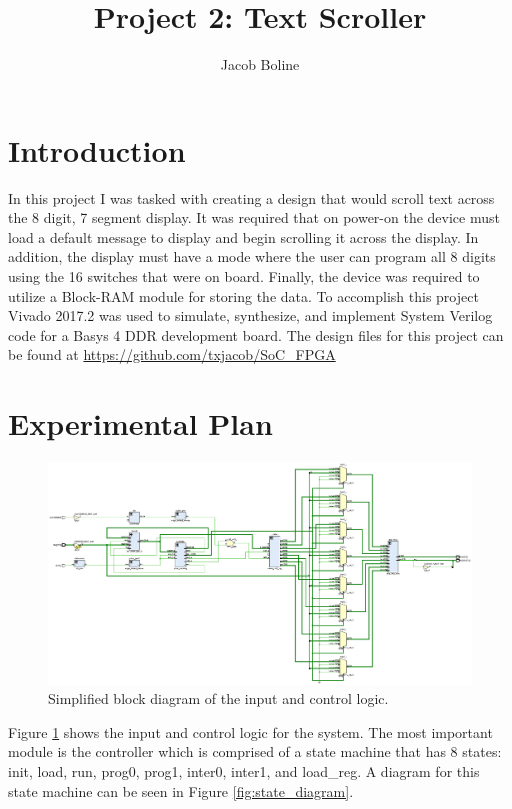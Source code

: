 \documentclass[11pt]{article}
\title{Project 2: Text Scroller}
\author{Jacob Boline}
\begin{document}
\maketitle

\section{Introduction}
In this project I was tasked with creating a design that would scroll text across the 8 digit, 7 segment display. It was required that on power-on the device must load a default message to display and begin scrolling it across the display. In addition, the display must have a mode where the user can program all 8 digits using the 16 switches that were on board. Finally, the device was required to utilize a Block-RAM module for storing the data.  To accomplish this project Vivado 2017.2 was used to simulate, synthesize, and implement System Verilog code for a Basys 4 DDR development board. The design files for this project can be found at \url{https://github.com/txjacob/SoC_FPGA}

\section{Experimental Plan}
\begin{figure}[H]
\includegraphics[trim={0.35cm 6.5cm 11cm 2.75cm}, clip,width=7 in]{./figures/schematic.eps}
	\centering
	\caption{Simplified block diagram of the input and control logic.}
	\label{fig:input_logic}
\end{figure}

Figure \ref{fig:input_logic} shows the input and control logic for the system. The most important module is the controller which is comprised of a state machine that has 8 states: init, load, run, prog0, prog1, inter0, inter1, and load\_reg. A diagram for this state machine can be seen in Figure \ref{fig:state_diagram}. 
\end{document}
